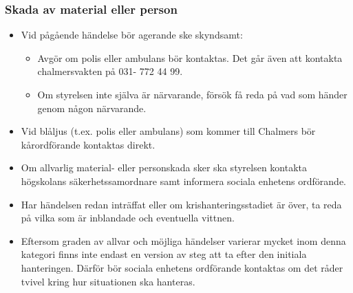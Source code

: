 \documentclass{dtek}
\begin{document}
\subsubsection{Skada av material eller person}
\begin{itemize}
    \item Vid pågående händelse bör agerande ske skyndsamt: 
    \begin{itemize}
        \item Avgör om polis eller ambulans bör kontaktas. Det går även att kontakta  
        chalmersvakten på 031- 772 44 99.
        \item Om styrelsen inte själva är närvarande, försök få reda på vad som händer genom någon närvarande. 
    \end{itemize}
    \item Vid blåljus (t.ex. polis eller ambulans) som kommer till Chalmers bör kårordförande kontaktas direkt.
    \item Om allvarlig material- eller personskada sker ska styrelsen kontakta högskolans säkerhetssamordnare samt informera sociala enhetens ordförande.
    \item Har händelsen redan inträffat eller om krishanteringsstadiet är över, ta reda på vilka som är inblandade och eventuella vittnen.
    \item Eftersom graden av allvar och möjliga händelser varierar mycket inom denna kategori finns  inte endast en version av steg att ta efter den initiala hanteringen. Därför bör sociala enhetens ordförande kontaktas om det råder tvivel kring hur situationen ska hanteras.
\end{itemize}
\end{document}
